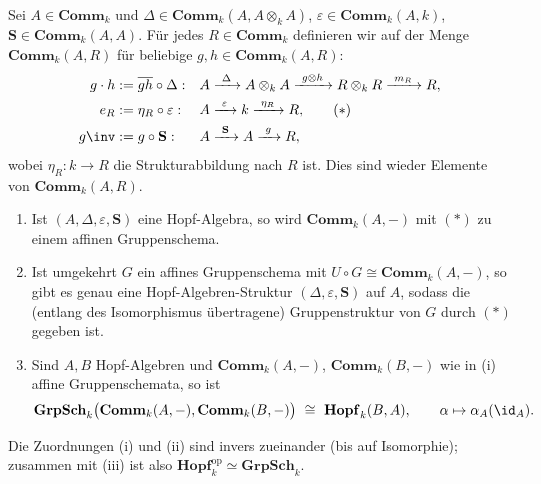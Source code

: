 \documentclass[11pt]{article}
\newcommand{\Comm}{\mathbf{Comm}}
\newcommand{\Sbold}{\mathbf{S}}
\newcommand{\GrpSch}{\mathbf{GrpSch}}
\newcommand{\Hopf}{\mathbf{Hopf}}
\begin{document}
 
 
\begin{theorem}[Hauptsatz] \Theorem
    Sei $A\in\Comm_k$ und $\Delta\in\Comm_k(A,A\otimes_k A)$, $\varepsilon\in\Comm_k(A,k)$, $\Sbold\in\Comm_k(A,A)$.
    Für jedes $R\in\Comm_k$ definieren wir auf der Menge $\Comm_k(A,R)$ für beliebige $g,h\in\Comm_k(A,R)$:
    \begin{align*}
        g\cdot h &:= \overline{gh}\circ\Delta: && A\xrightarrow{\ \Delta\ }A\otimes_k A\xrightarrow{\ g\otimes h\ }R\otimes_k R\xrightarrow{\ m_R\ }R,\\
        e_R &:= \eta_R\circ\varepsilon: && A\xrightarrow{\ \varepsilon\ }k\xrightarrow{\ \eta_R\ }R,\tag{$*$}\\
        g\inv &:= g\circ\Sbold: && A\xrightarrow{\ \Sbold\ }A\xrightarrow{\ g\ }R,
    \end{align*}
    wobei $\eta_R: k\to R$ die Strukturabbildung nach $R$ ist. Dies sind wieder Elemente von $\Comm_k(A,R)$.
    \begin{enumerate}[label=(\roman*)]
        \item Ist $(A,\Delta,\varepsilon,\Sbold)$ eine Hopf-Algebra, so wird $\Comm_k(A,-)$ mit $(*)$ zu einem affinen Gruppenschema.
        \item Ist umgekehrt $G$ ein affines Gruppenschema mit $U\circ G \cong \Comm_k(A,-)$, so gibt es genau eine Hopf-Algebren-Struktur
              $(\Delta,\varepsilon,\Sbold)$ auf $A$, sodass die (entlang des Isomorphismus übertragene) Gruppenstruktur von $G$ durch $(*)$ gegeben ist.
        \item Sind $A,B$ Hopf-Algebren und $\Comm_k(A,-)$, $\Comm_k(B,-)$ wie in (i) affine Gruppenschemata, so ist
              $$\GrpSch_k\big(\Comm_k(A,-),\Comm_k(B,-)\big)\ \cong\ \Hopf_k(B,A),\qquad \alpha\mapsto\alpha_A(\id_A).$$
    \end{enumerate}
    Die Zuordnungen (i) und (ii) sind invers zueinander (bis auf Isomorphie); zusammen mit (iii) ist also $\Hopf_k^{\mathrm{op}}\simeq\GrpSch_k$.
\end{theorem}
\end{document}
